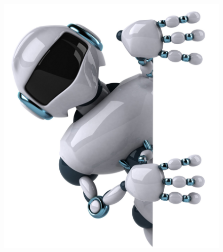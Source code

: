 \documentclass{beamer}
\begin{document}
\begin{frame}
\begin{figure}[hbtp]
\centering
\includegraphics[scale=0.1]{figures/bye-bye.jpeg}
\end{figure}
\end{frame}

\end{document}
